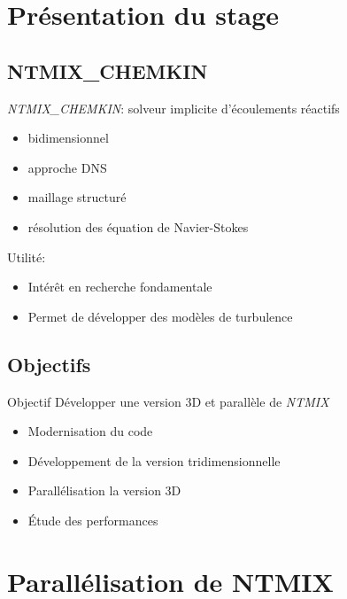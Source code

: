 \documentclass{beamer}
\begin{document}
%
%
\section{Présentation du stage}
\subsection{NTMIX\_CHEMKIN}
\begin{frame}
  \textit{NTMIX\_CHEMKIN}: solveur implicite d'écoulements réactifs
  \begin{itemize}
  \item bidimensionnel
  \item approche DNS
  \item maillage structuré
  \item résolution des équation de Navier-Stokes
  \end{itemize}
  
  \vfill
  Utilité:
  \begin{itemize}
  \item Intérêt en recherche fondamentale
  \item Permet de développer des modèles de turbulence
  \end{itemize}
\end{frame}


\subsection{Objectifs}
\begin{frame}

  \begin{block}{Objectif}
    Développer une version 3D et parallèle de \textit{NTMIX}
  \end{block}
  \begin{itemize}
  \item Modernisation du code
  \item Développement de la version tridimensionnelle
  \item Parallélisation la version 3D
  \item Étude des performances
  \end{itemize} 
\end{frame}


%
%

\section{Parallélisation de NTMIX}
\end{document}
